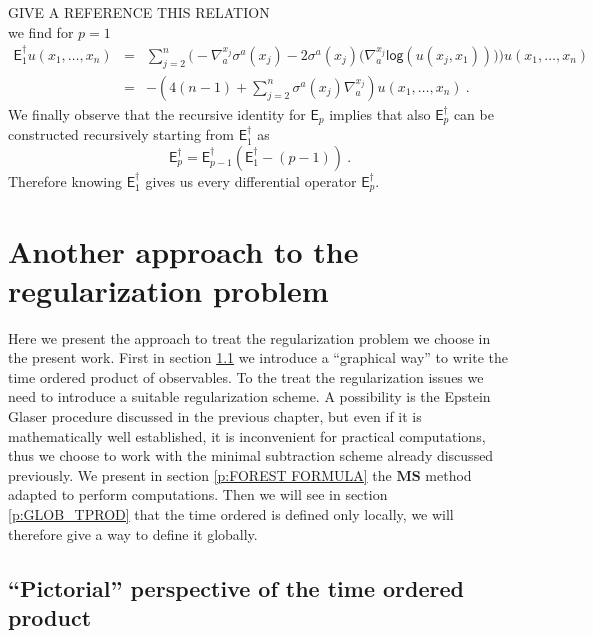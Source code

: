 \documentclass[11pt]{book}
\newcommand{\hilight}[1]{\colorbox{yellow!80!black}{#1}}
\newcommand{\MS}{\textbf{MS}}
\renewcommand{\log}{\mathsf{log}}
\newcommand{\Esf}{\mathsf{E}}
\theoremstyle{break}
\begin{document}
%
\hilight{GIVE A REFERENCE THIS RELATION} \\
we find for $p=1$
%
\begin{eqnarray}
\Esf_1^\dagger  u(x_1,\dots,x_n) &=& \sum_{j=2}^n \Bigg( - \nabla^{x_j}_a \sigma^a(x_j) - 2 \sigma^a(x_j) \bigg( \nabla^{x_j}_a \log\left(u(x_j,x_1)\right) \bigg) \Bigg) u(x_1,\dots,x_n) \nonumber \\
&=& -\left( 4(n-1) + \sum_{j=2}^n \sigma^a(x_j) \nabla^{x_j}_a \right) u(x_1,\dots,x_n) \ .
\label{eq:euler_operator}
\end{eqnarray}
%
We finally observe that the recursive identity for $\Esf_p$ implies that also $\Esf^\dagger_p$ can be constructed recursively starting from $\Esf^\dagger_1$ as 
%
\begin{equation*}
\Esf_p^\dagger = \Esf_{p-1}^\dagger \left(\Esf_1^\dagger-(p-1)\right) \ . 
\end{equation*}
%
Therefore knowing $\Esf_1^\dagger$ gives us every differential operator $\Esf_p^\dagger$.


\section{Another approach to the regularization problem}
\label{p:ANOTHER_APPROACH}


Here we present the approach to treat the regularization problem we choose in the present work. First in section \ref{p:PIC_REG_PB} we introduce a ``graphical way'' to write the time ordered product of observables. To the treat the regularization issues we need to introduce a suitable regularization scheme. A possibility is the Epstein Glaser procedure discussed in the previous chapter, but even if it is mathematically well established, it is inconvenient for practical computations, thus we choose to work with the minimal subtraction scheme already discussed previously. We present in section \ref{p:FOREST FORMULA} the $\MS$ method adapted to perform computations. Then we will see in section \ref{p:GLOB_TPROD} that the time ordered is defined only locally, we will therefore give a way to define it globally. 


\subsection{``Pictorial'' perspective of the time ordered product}
\label{p:PIC_REG_PB}
\end{document}

